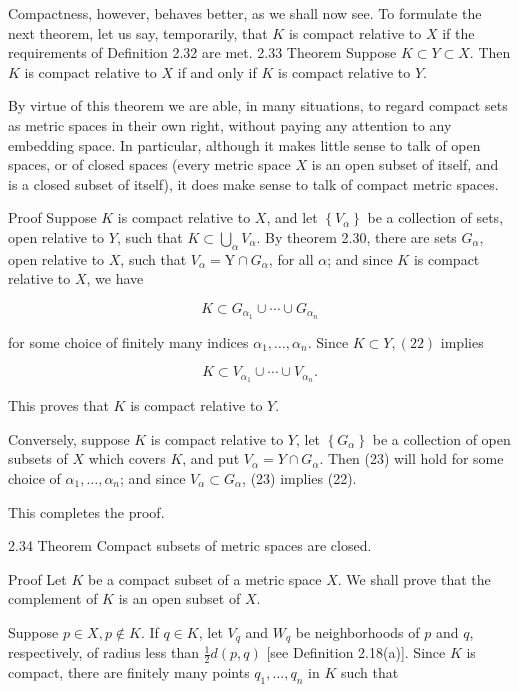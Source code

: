 \documentclass[10pt]{article}
\begin{document}
Compactness, however, behaves better, as we shall now see. To formulate the next theorem, let us say, temporarily, that $K$ is compact relative to $X$ if the requirements of Definition 2.32 are met. 2.33 Theorem Suppose $K \subset Y \subset X$. Then $K$ is compact relative to $X$ if and only if $K$ is compact relative to $Y$.

By virtue of this theorem we are able, in many situations, to regard compact sets as metric spaces in their own right, without paying any attention to any embedding space. In particular, although it makes little sense to talk of open spaces, or of closed spaces (every metric space $X$ is an open subset of itself, and is a closed subset of itself), it does make sense to talk of compact metric spaces.

Proof Suppose $K$ is compact relative to $X$, and let $\left\{V_{\alpha}\right\}$ be a collection of sets, open relative to $Y$, such that $K \subset \bigcup_{\alpha} V_{\alpha}$. By theorem 2.30, there are sets $G_{\alpha}$, open relative to $X$, such that $V_{\alpha}=\mathrm{Y} \cap G_{\alpha}$, for all $\alpha$; and since $K$ is compact relative to $X$, we have

$$
K \subset G_{\alpha_{1}} \cup \cdots \cup G_{\alpha_{n}}
$$

for some choice of finitely many indices $\alpha_{1}, \ldots, \alpha_{n}$. Since $K \subset Y,(22)$ implies

$$
K \subset V_{\alpha_{1}} \cup \cdots \cup V_{\alpha_{n}} .
$$

This proves that $K$ is compact relative to $Y$.

Conversely, suppose $K$ is compact relative to $Y$, let $\left\{G_{\alpha}\right\}$ be a collection of open subsets of $X$ which covers $K$, and put $V_{\alpha}=Y \cap G_{\alpha}$. Then (23) will hold for some choice of $\alpha_{1}, \ldots, \alpha_{n}$; and since $V_{\alpha} \subset G_{\alpha}$, (23) implies (22).

This completes the proof.

2.34 Theorem Compact subsets of metric spaces are closed.

Proof Let $K$ be a compact subset of a metric space $X$. We shall prove that the complement of $K$ is an open subset of $X$.

Suppose $p \in X, p \notin K$. If $q \in K$, let $V_{q}$ and $W_{q}$ be neighborhoods of $p$ and $q$, respectively, of radius less than $\frac{1}{2} d(p, q)$ [see Definition 2.18(a)]. Since $K$ is compact, there are finitely many points $q_{1}, \ldots, q_{n}$ in $K$ such that
\end{document}

